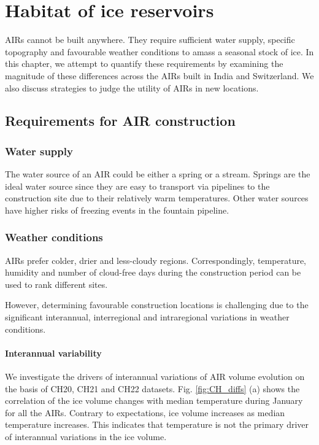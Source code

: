 \chapter{Habitat of ice reservoirs}

AIRs cannot be built anywhere. They require sufficient water supply, specific topography and favourable weather
conditions to amass a seasonal stock of ice. In this chapter, we attempt to quantify these requirements by
examining the magnitude of these differences across the AIRs built in India and Switzerland. We also discuss
strategies to judge the utility of AIRs in new locations.

\section{Requirements for AIR construction}

\subsection{Water supply}

The water source of an AIR could be either a spring or a stream. Springs are the ideal water source since they
are easy to transport via pipelines to the construction site due to their relatively warm temperatures. Other
water sources have higher risks of freezing events in the fountain pipeline.

\subsection{Weather conditions}

AIRs prefer colder, drier and less-cloudy regions. Correspondingly, temperature, humidity and number of
cloud-free days during the construction period can be used to rank different sites. 

However, determining favourable construction locations is challenging due to the significant interannual,
interregional and intraregional variations in weather conditions.

\subsubsection{Interannual variability}

We investigate the drivers of interannual variations of AIR volume evolution on the basis of CH20, CH21 and CH22
datasets. Fig. \ref{fig:CH_diffs} (a) shows the correlation of the ice volume changes with median temperature
during January for all the AIRs. Contrary to expectations, ice volume increases as median temperature increases.
This indicates that temperature is not the primary driver of interannual variations in the ice volume. 

